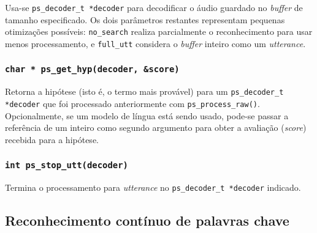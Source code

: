 Usa-se \texttt{ps\_decoder\_t *decoder} para decodificar o áudio guardado no \textit{buffer} de tamanho especificado. Os dois parâmetros restantes representam pequenas otimizações possíveis: \texttt{no\_search} realiza parcialmente o reconhecimento para usar menos processamento, e \texttt{full\_utt} considera o \textit{buffer} inteiro como um \textit{utterance}.

\subsubsection{\texttt{char * ps\_get\_hyp(decoder, \&score)}}

Retorna a hipótese (isto é, o termo mais provável) para um \texttt{ps\_decoder\_t *decoder} que foi processado anteriormente com \texttt{ps\_process\_raw()}. Opcionalmente, se um modelo de língua está sendo usado, pode-se passar a referência de um inteiro como segundo argumento para obter a avaliação (\textit{score}) recebida para a hipótese.

\subsubsection{\texttt{int ps\_stop\_utt(decoder)}}
Termina o processamento para \textit{utterance} no \texttt{ps\_decoder\_t *decoder} indicado.


\subsection{Reconhecimento contínuo de palavras chave}
